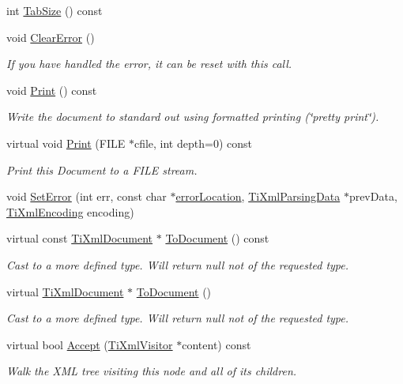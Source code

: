 \begin{DoxyCompactItemize}
int \hyperlink{class_ti_xml_document_a612360241b85bad0826b2a9ae9cda561}{TabSize} () const 
\item 
void \hyperlink{class_ti_xml_document_ac66b8c28db86363315712a3574e87c35}{ClearError} ()
\begin{DoxyCompactList}\small\item\em If you have handled the error, it can be reset with this call. \end{DoxyCompactList}\item 
void \hyperlink{class_ti_xml_document_af08389ec70ee9b2de7f800e206a18510}{Print} () const 
\begin{DoxyCompactList}\small\item\em Write the document to standard out using formatted printing (\char`\"{}pretty print\char`\"{}). \end{DoxyCompactList}\item 
virtual void \hyperlink{class_ti_xml_document_a7b1aea204fee266b70b9c105c8bf2ada}{Print} (FILE $\ast$cfile, int depth=0) const 
\begin{DoxyCompactList}\small\item\em Print this Document to a FILE stream. \end{DoxyCompactList}\item 
void \hyperlink{class_ti_xml_document_a735c23e318597b920c94eae77fa206de}{SetError} (int err, const char $\ast$\hyperlink{class_ti_xml_document_aa4030f989f1549f6b897147fc2851d1a}{errorLocation}, \hyperlink{class_ti_xml_parsing_data}{TiXmlParsingData} $\ast$prevData, \hyperlink{tinyxml_8h_a88d51847a13ee0f4b4d320d03d2c4d96}{TiXmlEncoding} encoding)
\item 
virtual const \hyperlink{class_ti_xml_document}{TiXmlDocument} $\ast$ \hyperlink{class_ti_xml_document_a1dc977bde3e4fe85a8eb9d88a35ef5a4}{ToDocument} () const 
\begin{DoxyCompactList}\small\item\em Cast to a more defined type. Will return null not of the requested type. \end{DoxyCompactList}\item 
virtual \hyperlink{class_ti_xml_document}{TiXmlDocument} $\ast$ \hyperlink{class_ti_xml_document_a1025d942a1f328fd742d545e37efdd42}{ToDocument} ()
\begin{DoxyCompactList}\small\item\em Cast to a more defined type. Will return null not of the requested type. \end{DoxyCompactList}\item 
virtual bool \hyperlink{class_ti_xml_document_a3daab2f472418ef66315750202f762ae}{Accept} (\hyperlink{class_ti_xml_visitor}{TiXmlVisitor} $\ast$content) const 
\begin{DoxyCompactList}\small\item\em Walk the XML tree visiting this node and all of its children. \end{DoxyCompactList}\end{DoxyCompactItemize}
